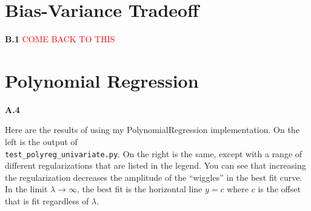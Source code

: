 \documentclass{article}
\newcommand{\note}[1]{\textsf{\textcolor{Red}{#1}}}
\begin{document}
\newpage

\section*{Bias-Variance Tradeoff}

\textbf{B.1}
\note{COME BACK TO THIS}

\newpage

\section*{Polynomial Regression}

\textbf{A.4}

Here are the results of using my PolynomialRegression implementation.
On the left is the output of \\ \texttt{test\_polyreg\_univariate.py}.
On the right is the same, except with a range of different regularizations that are listed in the legend.
You can see that increasing the regularization decreases the amplitude of the ``wiggles'' in the best fit curve.
In the limit $\lambda \to \infty$, the best fit is the horizontal line $y = c$ where $c$ is the offset that is fit regardless of $\lambda$.
\end{document}
